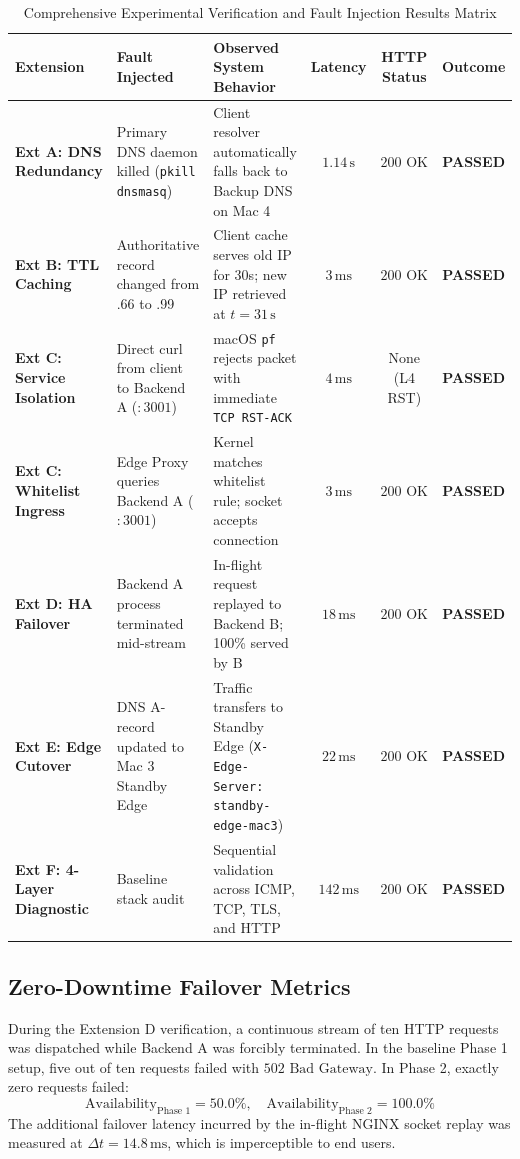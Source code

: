 \documentclass[conference]{IEEEtran}
\begin{document}
\begin{table}[t]
\centering
\caption{Comprehensive Experimental Verification and Fault Injection Results Matrix}
\label{tab:results}
\begin{tabularx}{\textwidth}{l p{4.5cm} p{4.5cm} c c c}
\toprule
\textbf{Extension} & \textbf{Fault Injected} & \textbf{Observed System Behavior} & \textbf{Latency} & \textbf{HTTP Status} & \textbf{Outcome} \\
\midrule
\textbf{Ext A: DNS Redundancy} & Primary DNS daemon killed (\texttt{pkill dnsmasq}) & Client resolver automatically falls back to Backup DNS on Mac 4 & $1.14\,\text{s}$ & $200\text{ OK}$ & \textbf{PASSED} \\
\textbf{Ext B: TTL Caching} & Authoritative record changed from .66 to .99 & Client cache serves old IP for 30s; new IP retrieved at $t=31\,\text{s}$ & $3\,\text{ms}$ & $200\text{ OK}$ & \textbf{PASSED} \\
\textbf{Ext C: Service Isolation} & Direct curl from client to Backend A ($:3001$) & macOS \texttt{pf} rejects packet with immediate \texttt{TCP RST-ACK} & $4\,\text{ms}$ & None (L4 RST) & \textbf{PASSED} \\
\textbf{Ext C: Whitelist Ingress} & Edge Proxy queries Backend A ($:3001$) & Kernel matches whitelist rule; socket accepts connection & $3\,\text{ms}$ & $200\text{ OK}$ & \textbf{PASSED} \\
\textbf{Ext D: HA Failover} & Backend A process terminated mid-stream & In-flight request replayed to Backend B; 100\% served by B & $18\,\text{ms}$ & $200\text{ OK}$ & \textbf{PASSED} \\
\textbf{Ext E: Edge Cutover} & DNS A-record updated to Mac 3 Standby Edge & Traffic transfers to Standby Edge (\texttt{X-Edge-Server: standby-edge-mac3}) & $22\,\text{ms}$ & $200\text{ OK}$ & \textbf{PASSED} \\
\textbf{Ext F: 4-Layer Diagnostic} & Baseline stack audit & Sequential validation across ICMP, TCP, TLS, and HTTP & $142\,\text{ms}$ & $200\text{ OK}$ & \textbf{PASSED} \\
\bottomrule
\end{tabularx}
\end{table}

\subsection{Zero-Downtime Failover Metrics}
During the Extension D verification, a continuous stream of ten HTTP requests was dispatched while Backend A was forcibly terminated. In the baseline Phase 1 setup, five out of ten requests failed with $502\text{ Bad Gateway}$. In Phase 2, exactly zero requests failed:
\begin{equation}
\text{Availability}_{\text{Phase 1}} = 50.0\%, \quad \text{Availability}_{\text{Phase 2}} = 100.0\%
\end{equation}
The additional failover latency incurred by the in-flight NGINX socket replay was measured at $\Delta t = 14.8\,\text{ms}$, which is imperceptible to end users.
\end{document}
